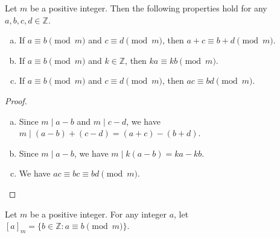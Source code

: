 \documentclass[11pt]{article}
\newcommand{\ZZ}{\mathbb{Z}}
\begin{document}
\begin{proposition}
  Let $m$ be a positive integer.
  Then the following properties hold for any $a, b, c, d \in \ZZ$.
  \begin{enumerate}[(a)]
    \item If $a \equiv b \pmod m$ and $c \equiv d \pmod m$, then $a + c \equiv b + d \pmod m$.
    \item If $a \equiv b \pmod m$ and $k \in \ZZ$, then $ka \equiv kb \pmod m$.
    \item If $a \equiv b \pmod m$ and $c \equiv d \pmod m$, then $ac \equiv bd \pmod m$.
  \end{enumerate}
\end{proposition}
\begin{proof}
  \leavevmode
  \begin{enumerate}[(a)]
    \item Since $m \mid a - b$ and $m \mid c - d$, we have $m \mid (a - b) + (c - d) = (a + c) - (b + d)$.
    \item Since $m \mid a - b$, we have $m \mid k(a - b) = ka - kb$.
    \item We have $ac \equiv bc \equiv bd \pmod m$.
    \qedhere
  \end{enumerate}
\end{proof}

\begin{definition}
  Let $m$ be a positive integer.
  For any integer $a$, let $[a]_m = \{b \in \ZZ: a \equiv b \pmod m\}$.
\end{definition}
\end{document}
